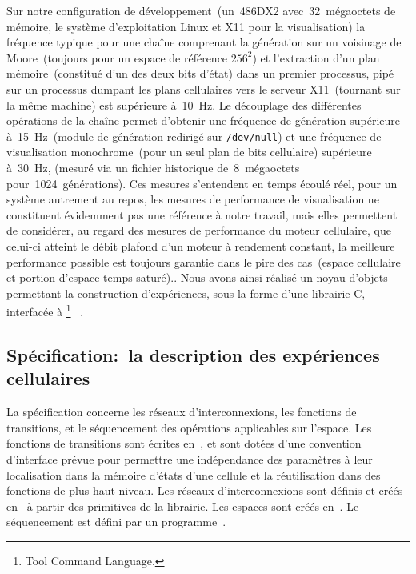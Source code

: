 {  Sur notre configuration de développement~(un~486DX2 avec~32~mégaoctets
  de mémoire, le système d'exploitation Linux et X11 pour la
  visualisation) la fréquence typique pour une chaîne comprenant la
  génération sur un voisinage de Moore~(toujours pour un espace de
  référence $256^2$) et l'extraction d'un plan mémoire~(constitué d'un
  des deux bits d'état) dans un premier processus, pipé sur un processus
  dumpant les plans cellulaires vers le serveur X11~(tournant sur la
  même machine) est supérieure à~10~Hz. %
  Le découplage des différentes opérations de la chaîne permet
  d'obtenir une fréquence de génération supérieure à~15~Hz~(module de
  génération redirigé sur \texttt{/dev/null}) et une fréquence de
  visualisation monochrome~(pour un seul plan de bits cellulaire)
  supérieure à~30~Hz, (mesuré via un fichier historique
  de~8~mégaoctets pour~1024~générations). %
  Ces mesures s'entendent en temps écoulé réel, pour un système
  autrement au repos, les mesures de performance de visualisation ne
  constituent évidemment pas une référence à notre travail, mais elles
  permettent de considérer, au regard des mesures de performance du
  moteur cellulaire, que celui-ci atteint le débit plafond d'un moteur
  à rendement constant, \ie la meilleure performance possible est
  toujours garantie dans le pire des
  cas~(espace cellulaire et portion d'espace-temps saturé).}. %
Nous avons ainsi réalisé un noyau d'objets permettant la construction
d'expériences, sous la forme d'une librairie C, interfacée à
\footnote{%
  Tool Command Language.}%
~\cite[]{Ousterhout90,Ousterhout91}. %

\subsection*{Spécification:~la description des expériences cellulaires}

La spécification concerne les réseaux d'interconnexions, les fonc\-tions
de transitions, et le séquencement des opérations applicables sur
l'espace. %
Les fonc\-tions de transitions sont écrites en~, et sont dotées
d'une convention d'interface prévue pour permettre une indépendance
des paramètres à leur localisation dans la mémoire d'états d'une
cellule et la réutilisation dans des fonctions de plus haut niveau. %
Les réseaux d'interconnexions sont définis et créés en~ à
partir des primitives de la librairie. %
Les espaces sont créés en~. %
Le séquencement est défini par un programme~. %

